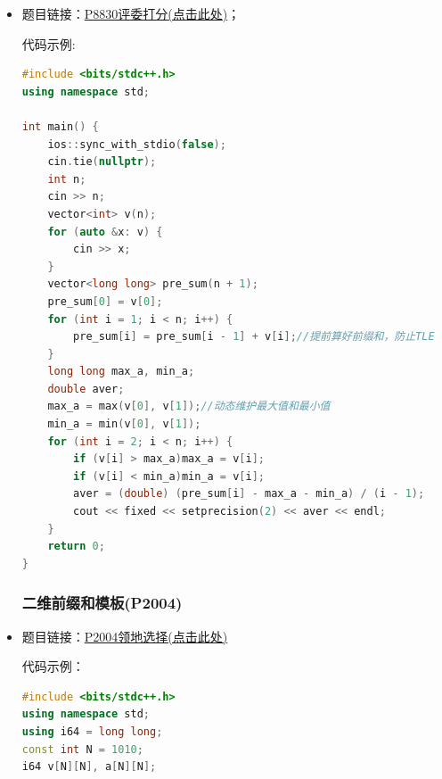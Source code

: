 \begin{itemize}
\begin{lstlisting}[language=C++]
	//求相同路段出现的次数
	vector<ll> cf(n + 2, 0);//防止越界
	for(ll i = 1; i < m; i++) {
		ll l = min(v[i], v[i + 1]);
		ll r = max(v[i], v[i + 1]);
		cf[l] += 1;
		cf[r] -= 1;
	}
	for(ll i = 1; i <= n-1; i++) {
		cf[i] += cf[i - 1]; //对差分求前缀和
	}
	//最小花费
	ll ans = 0;
	for(ll i = 1; i <= n-1; i++) {
		if(cf[i] == 0) {
			continue;
		}
		ll cost_no = cf[i] * a[i];
		ll cost_ic = c[i] + cf[i] * b[i];
		ans += min(cost_no, cost_ic);
	}
	cout << ans << endl;
}

\end{lstlisting}
\textcolor{red}{总结：}其实前缀和和差分一般结合使用，可用来计算一个区间内重复的次数；
\subsubsection{P8830(评委打分)}
\item 题目链接：\href{https://www.luogu.com.cn/problem/P8830}{P8830评委打分(点击此处)}；

代码示例:\\
\begin{lstlisting}[language=C++]
#include <bits/stdc++.h>
using namespace std;

int main() {
	ios::sync_with_stdio(false);
	cin.tie(nullptr);
	int n;
	cin >> n;
	vector<int> v(n);
	for (auto &x: v) {
		cin >> x;
	}
	vector<long long> pre_sum(n + 1);
	pre_sum[0] = v[0];
	for (int i = 1; i < n; i++) {
		pre_sum[i] = pre_sum[i - 1] + v[i];//提前算好前缀和，防止TLE
	}
	long long max_a, min_a;
	double aver;
	max_a = max(v[0], v[1]);//动态维护最大值和最小值
	min_a = min(v[0], v[1]);
	for (int i = 2; i < n; i++) {
		if (v[i] > max_a)max_a = v[i];
		if (v[i] < min_a)min_a = v[i];
		aver = (double) (pre_sum[i] - max_a - min_a) / (i - 1);
		cout << fixed << setprecision(2) << aver << endl;
	}
	return 0;
}

\end{lstlisting}
\subsubsection{二维前缀和模板(P2004)}
\item 题目链接：\href{https://www.luogu.com.cn/problem/P2004}{P2004领地选择(点击此处)}

代码示例：\\
\begin{lstlisting}[language=C++]
#include <bits/stdc++.h>
using namespace std;
using i64 = long long;
const int N = 1010;
i64 v[N][N], a[N][N];


\end{lstlisting}
\end{itemize}
